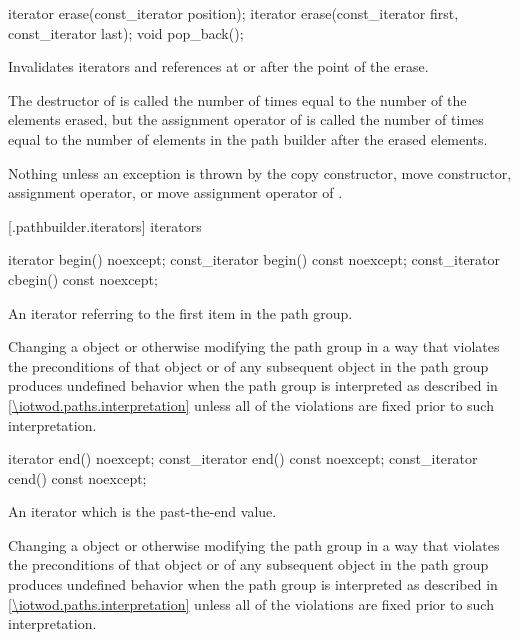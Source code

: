 %
%
\begin{itemdecl}
iterator erase(const_iterator position);
iterator erase(const_iterator first, const_iterator last);
void pop_back();
\end{itemdecl}

\begin{itemdescr}
\pnum
\effects
Invalidates iterators and references at or after the point of the erase.

\pnum
\complexity
The destructor of  is called the number of times equal to 
the number of the elements erased, but the assignment operator
of  is called the number of times equal to the number of
elements in the path builder after the erased elements.

\pnum
\throws
Nothing unless an exception is thrown by the copy constructor, move 
constructor, assignment operator, or move assignment operator of
.
\end{itemdescr}

 [\iotwod.pathbuilder.iterators] { iterators}

%
%
\begin{itemdecl}
iterator begin() noexcept;
const_iterator begin() const noexcept;
const_iterator cbegin() const noexcept;
\end{itemdecl}
\begin{itemdescr}
\pnum
\returns
An iterator referring to the first  item in the path group.

\pnum
\remarks
Changing a  object or otherwise modifying the path group in a way that violates the preconditions of that  object or of any subsequent  object in the path group produces undefined behavior when the path group is interpreted as described in \ref{\iotwod.paths.interpretation} unless all of the violations are fixed prior to such interpretation.
\end{itemdescr}

%
%
\begin{itemdecl}
iterator end() noexcept;
const_iterator end() const noexcept;
const_iterator cend() const noexcept;
\end{itemdecl}
\begin{itemdescr}
\pnum
\returns
An iterator which is the past-the-end value.

\pnum
\remarks
Changing a  object or otherwise modifying the path group in a way that violates the preconditions of that  object or of any subsequent  object in the path group produces undefined behavior when the path group is interpreted as described in \ref{\iotwod.paths.interpretation} unless all of the violations are fixed prior to such interpretation.
\end{itemdescr}

